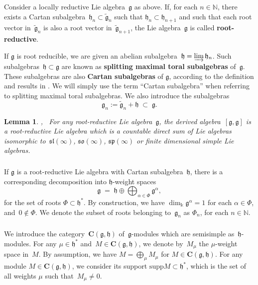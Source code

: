 \documentclass[11pt]{amsart}
\newcommand{\supp}{\mathrm{supp}}
\newcommand{\rR}{\Phi}
\newcommand{\tto}{\twoheadrightarrow}
\newcommand{\bC}{\mathbf{C}}
\newcommand{\mk}{\Bbbk}
\newcommand{\fg}{\mathfrak{g}}
\newcommand{\fh}{\mathfrak{h}}
\newcommand{\mN}{\mathbb{N}}
\numberwithin{equation}{section}
\theoremstyle{plain}
\newtheorem{lemma}[subsubsection]{Lemma}
\theoremstyle{remark}
\theoremstyle{remark}
\theoremstyle{construction}
\begin{document}
\subsubsection{}\label{DefrrL}
Consider a locally reductive Lie algebra~$\fg$ as above. If, for each $n\in\mN$, there exists a Cartan subalgebra~$\fh_n\subset\widetilde{\fg}_n$ such that $\fh_n\subset\fh_{n+1}$ and such that each root vector in~$\widetilde{\fg}_n$ is also a root vector in~$\widetilde{\fg}_{n+1}$, the Lie algebra~$\fg$ is called
{\bf root-reductive}.

{If $\fg$ is root reducible}, we {are given an} abelian subalgebra~$\fh=\varinjlim\fh_n$. {Such} subalgebras~$\fh\subset\fg$ are known as {\bf splitting maximal toral subalgebras} of~$\fg$. These subalgebras are also {\bf Cartan subalgebras} of $\fg$, according to the definition and results in \cite[Section~3]{DPS}. We will simply use the term ``Cartan subalgebra'' when referring to splitting maximal toral subalgebras. %
 We also introduce the subalgebras~$$\fg_n:=\widetilde{\fg}_n+\fh\;\subset\;\fg.$$

\begin{lemma} \cite[Theorem~4.1]{DPS},~\cite[Theorem~1]{DP}
For any root-reductive Lie algebra~$\fg$, the derived algebra~$[\fg,\fg]$ is a root-reductive Lie algebra which is a countable direct sum of Lie algebras isomorphic to~$\mathfrak{sl}(\infty)$, $\mathfrak{so}(\infty)$, $\mathfrak{sp}(\infty)$ or finite dimensional simple Lie algebras.
\end{lemma}


\subsubsection{}If $\fg$ is a root-reductive Lie algebra with Cartan subalgebra~$\fh$, {there is} a corresponding decomposition into $\fh$-weight spaces
\begin{equation}\label{rootdec}\fg\;=\;\fh\oplus\bigoplus_{\alpha\in\rR}\fg^{\alpha},\end{equation}
for the set of roots $\rR\subset\fh^\ast$. By construction, we have $\dim_{\mk}\fg^\alpha=1$ for each $\alpha\in \rR$, and~$0\not\in\rR$. We denote the subset of roots belonging to~$\fg_n$ as $\rR_n$, for each $n\in\mN$.

\subsubsection{}\label{SecWeightM}We introduce the category~$\bC(\fg,\fh)$ of~$\fg$-modules which are 
semisimple as~$\fh$-modules. For any $\mu\in\fh^\ast$ and~$M\in\bC(\fg,\fh)$, we denote by~$M_\mu$ the $\mu$-weight space in~$M$. By assumption, we have $M=\bigoplus_\mu M_\mu$ for $M\in \bC(\fg,\fh)$. 
 For any module $M\in\bC(\fg,\fh)$, we consider its support $\supp M\subset \fh^\ast$, which is the set of all weights $\mu$ such that~$M_\mu\not=0$. 
 
\end{document}
